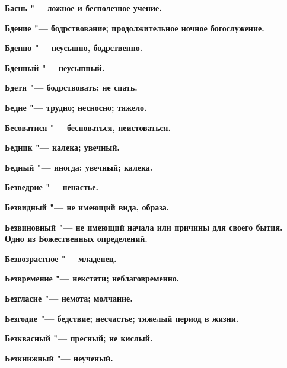 \bfseries Баснь \normalfont{} "--- ложное и бесполезное учение. 




\bfseries Бдение \normalfont{} "--- бодрствование; продолжительное ночное богослужение. 




\bfseries Бденно \normalfont{} "--- неусыпно, бодрственно. 




\bfseries Бденный \normalfont{} "--- неусыпный. 




\bfseries Бдети \normalfont{} "--- бодрствовать; не спать. 




\bfseries Бедне \normalfont{} "--- трудно; несносно; тяжело. 




\bfseries Бесоватися \normalfont{} "--- бесноваться, неистоваться. 




\bfseries Бедник \normalfont{} "--- калека; увечный. 




\bfseries Бедный \normalfont{} "--- иногда: увечный; калека. 




\bfseries Безведрие \normalfont{} "--- ненастье. 




\bfseries Безвидный \normalfont{} "--- не имеющий вида, образа. 




\bfseries Безвиновный \normalfont{} "--- не имеющий начала или причины для своего бытия. Одно из Божественных определений. 




\bfseries Безвозрастное \normalfont{} "--- младенец. 




\bfseries Безвременне \normalfont{} "--- некстати; неблаговременно. 




\bfseries Безгласие \normalfont{} "--- немота; молчание. 




\bfseries Безгодие \normalfont{} "--- бедствие; несчастье; тяжелый период в жизни. 




\bfseries Безквасный \normalfont{} "--- пресный; не кислый. 




\bfseries Безкнижный \normalfont{} "--- неученый. 




